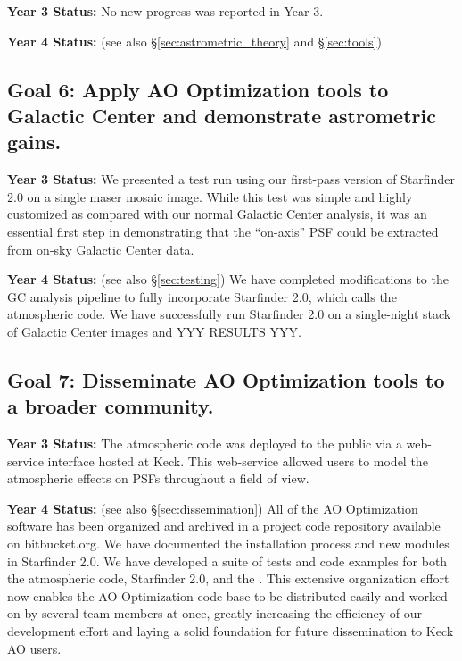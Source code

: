 \noindent
\textbf{Year 3 Status:}
No new progress was reported in Year 3.

\noindent
\textbf{Year 4 Status:}
(see also \S\ref{sec:astrometric_theory} and \S\ref{sec:tools})


\subsection{Goal 6: Apply AO Optimization tools to Galactic Center and demonstrate
  astrometric gains.}

\noindent
\textbf{Year 3 Status:}
We presented a test run using our first-pass version of Starfinder
2.0 on a single maser mosaic image. While this test was simple and highly
customized as compared with our normal Galactic Center
analysis, it was an essential first step in demonstrating that the
``on-axis'' PSF could be extracted from on-sky Galactic Center data.
 
\noindent
\textbf{Year 4 Status:}
(see also \S\ref{sec:testing})
 We have completed modifications to the GC analysis pipeline to fully
incorporate Starfinder 2.0, which calls the atmospheric code. We have
successfully run Starfinder 2.0 on a single-night stack of Galactic
Center images and YYY RESULTS YYY.


\subsection{Goal 7: Disseminate AO Optimization tools to a broader community.}

\noindent
\textbf{Year 3 Status:}
The atmospheric code was deployed to the public via a web-service
interface hosted at Keck. This web-service allowed users to model
the atmospheric effects on PSFs throughout a field of view. 

\noindent
\textbf{Year 4 Status:}
(see also \S\ref{sec:dissemination})
All of the AO Optimization software has been organized and archived in
a project code repository available on bitbucket.org. We have
documented the installation process and new modules in Starfinder
2.0. We have developed a suite of tests and code examples for both the
atmospheric code, Starfinder 2.0, and the . This extensive
organization effort now enables the AO Optimization code-base to be
distributed easily and worked on by several team members at once,
greatly increasing the efficiency of our development effort and laying
a solid foundation for future dissemination to Keck AO users.

